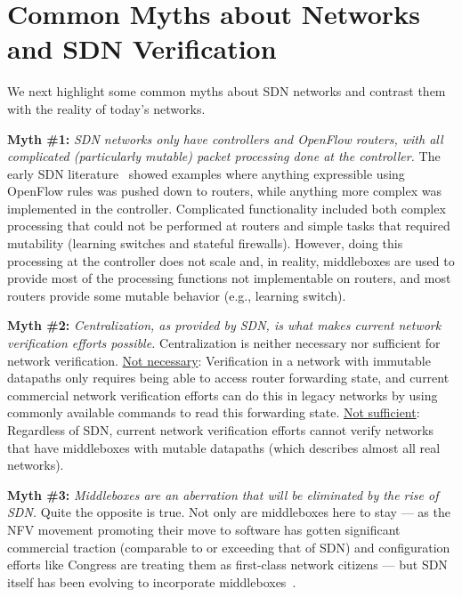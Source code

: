 \section{Common Myths about Networks and SDN Verification}

We next highlight some common myths about SDN networks and contrast them with the reality of today's networks.

\medskip{}

{\noindent \bf Myth \#1:} \emph{SDN networks only have controllers and OpenFlow routers, with all complicated (particularly mutable) packet processing done at the controller.} The early SDN literature~\cite{gude2008nox, monsanto2013composing} showed examples where anything expressible using OpenFlow rules was pushed down to routers, while anything more complex was implemented in the controller. Complicated functionality
included both complex processing that could not be performed at routers and simple tasks that required mutability (\eg learning switches and stateful firewalls). However, doing this processing at the controller does not scale and, in reality, middleboxes are used to provide most
of the processing functions not implementable on routers, and most routers provide some mutable behavior (e.g., learning switch).

{\noindent \bf Myth \#2:} \emph{Centralization, as provided by SDN, is what makes current network verification efforts possible.} Centralization is neither necessary nor sufficient for network verification. {\underline{Not necessary}:} Verification in a network with immutable datapaths only requires being able to access router forwarding state, and current commercial network verification efforts can do this in legacy networks by using commonly available commands to read this forwarding state. {\underline{Not sufficient}:} Regardless of SDN, current network verification efforts cannot verify networks that have middleboxes with mutable datapaths (which describes almost all real networks).

{\noindent \bf Myth \#3:} \emph{Middleboxes are an aberration that will be eliminated by the rise of SDN.} Quite the opposite is true. Not only are middleboxes here to stay --- as the NFV movement promoting their move to software has gotten significant commercial traction (comparable to or exceeding that of SDN) and configuration efforts like Congress \cite{congress} are treating them as first-class network citizens --- but SDN itself has been evolving to incorporate middleboxes~\cite{scottI2talk}.

